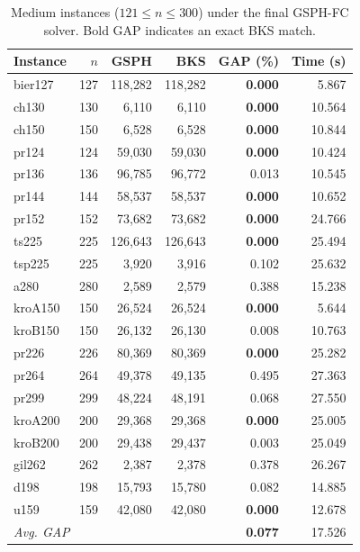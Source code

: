 \documentclass[runningheads]{llncs}
\begin{document}
\begin{table}
\caption{Medium instances ($121\le n\le 300$) under the final GSPH-FC solver.
Bold GAP indicates an exact BKS match.}
\label{tab:medium}
\centering\scriptsize
\begin{tabular}{@{}lrrrrr@{}}
\toprule
\textbf{Instance} & $n$ & \textbf{GSPH} & \textbf{BKS} & \textbf{GAP (\%)} & \textbf{Time (s)}\\
\midrule
bier127  & 127 & 118{,}282 & 118{,}282 & \textbf{0.000} & 5.867 \\
 ch130    & 130 &   6{,}110 &   6{,}110 & \textbf{0.000} & 10.564 \\
 ch150    & 150 &   6{,}528 &   6{,}528 & \textbf{0.000} & 10.844 \\
 pr124    & 124 &  59{,}030 &  59{,}030 & \textbf{0.000} & 10.424 \\
 pr136    & 136 &  96{,}785 &  96{,}772 & 0.013 & 10.545 \\
 pr144    & 144 &  58{,}537 &  58{,}537 & \textbf{0.000} & 10.652 \\
 pr152    & 152 &  73{,}682 &  73{,}682 & \textbf{0.000} & 24.766 \\
 ts225    & 225 & 126{,}643 & 126{,}643 & \textbf{0.000} & 25.494 \\
 tsp225   & 225 &   3{,}920 &   3{,}916 & 0.102 & 25.632 \\
 a280     & 280 &   2{,}589 &   2{,}579 & 0.388 & 15.238 \\
 kroA150  & 150 &  26{,}524 &  26{,}524 & \textbf{0.000} & 5.644 \\
 kroB150  & 150 &  26{,}132 &  26{,}130 & 0.008 & 10.763 \\
 pr226    & 226 &  80{,}369 &  80{,}369 & \textbf{0.000} & 25.282 \\
 pr264    & 264 &  49{,}378 &  49{,}135 & 0.495 & 27.363 \\
 pr299    & 299 &  48{,}224 &  48{,}191 & 0.068 & 27.550 \\
 kroA200  & 200 &  29{,}368 &  29{,}368 & \textbf{0.000} & 25.005 \\
 kroB200  & 200 &  29{,}438 &  29{,}437 & 0.003 & 25.049 \\
 gil262   & 262 &   2{,}387 &   2{,}378 & 0.378 & 26.267 \\
 d198     & 198 &  15{,}793 &  15{,}780 & 0.082 & 14.885 \\
 u159     & 159 &  42{,}080 &  42{,}080 & \textbf{0.000} & 12.678 \\
\midrule
\multicolumn{4}{l}{\textit{Avg. GAP}} & \textbf{0.077} & 17.526 \\
\bottomrule
\end{tabular}
\end{table}
\end{document}
